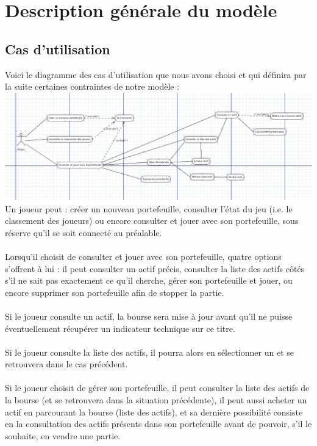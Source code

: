 \section{Description générale du modèle}

\subsection{Cas d'utilisation}
Voici le diagramme des cas d'utilisation que nous avons choisi et qui définira par la suite certaines contraintes de notre modèle :\\
\includegraphics[width=\textwidth,height=\textheight,keepaspectratio]{../graph/CasDutilisationGeneral.png}
\\
Un joueur peut : créer un nouveau portefeuille, consulter l'état du jeu (i.e. le classement des joueurs) ou encore consulter et jouer avec son portefeuille, sous réserve qu'il se soit connecté au préalable. \\ \\
Lorsqu'il choisit de consulter et jouer avec son portefeuille, quatre options s'offrent à lui : il peut consulter un actif précis, consulter la liste des actifs côtés s'il ne sait pas exactement ce qu'il cherche, gérer son portefeuille et jouer, ou encore supprimer son portefeuille afin de stopper la partie. \\ \\
Si le joueur consulte un actif, la bourse sera mise à jour avant qu'il ne puisse éventuellement récupérer un indicateur technique sur ce titre.\\ \\
Si le joueur consulte la liste des actifs, il pourra alors en sélectionner un et se retrouvera dans le cas précédent. \\ \\
Si le joueur choisit de gérer son portefeuille, il peut consulter la liste des actifs de la bourse (et se retrouvera dans la situation précédente), il peut aussi acheter un actif en parcourant la bourse (liste des actifs), et sa dernière possibilité consiste en la consultation des actifs présents dans son portefeuille avant de pouvoir, s'il le souhaite, en vendre une partie.
